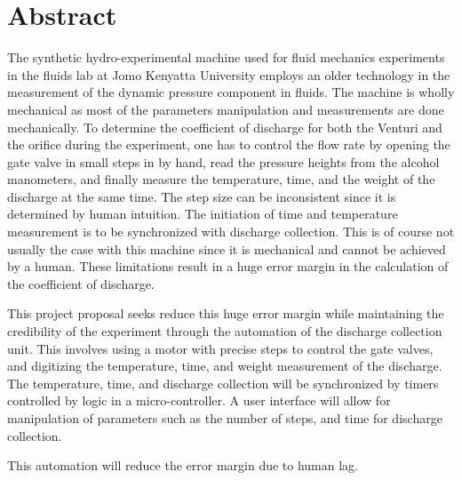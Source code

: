 \section*{Abstract}
\label{sec:}
The synthetic hydro-experimental machine used for fluid mechanics experiments in the fluids lab at Jomo Kenyatta University employs an older technology in the measurement of the dynamic pressure component in fluids. The machine is wholly mechanical as most of the parameters manipulation and measurements are done mechanically. To determine the coefficient of discharge for both the Venturi and the orifice during the experiment, one has to control the flow rate by opening the gate valve in small steps in by hand, read the pressure heights from the alcohol manometers, and finally measure the temperature, time, and the weight of the discharge at the same time.  The step size can be inconsistent since it is determined by human intuition. The initiation of time and temperature measurement is to be synchronized with discharge collection. This is of course not usually the case with this machine since it is mechanical and cannot be achieved by a human. These limitations result in a huge error margin in the calculation of the coefficient of discharge.
\par
This project proposal seeks reduce this huge error margin while maintaining the credibility of the experiment through the automation of the discharge collection unit. This involves using a motor with precise steps to control the gate valves, and digitizing the temperature, time, and weight measurement of the discharge. The temperature, time, and discharge collection will be synchronized by timers controlled by logic in a micro-controller. A user interface will allow for manipulation of parameters such as the number of steps, and time for discharge collection.
\par
This automation will reduce the error margin due to human lag.
